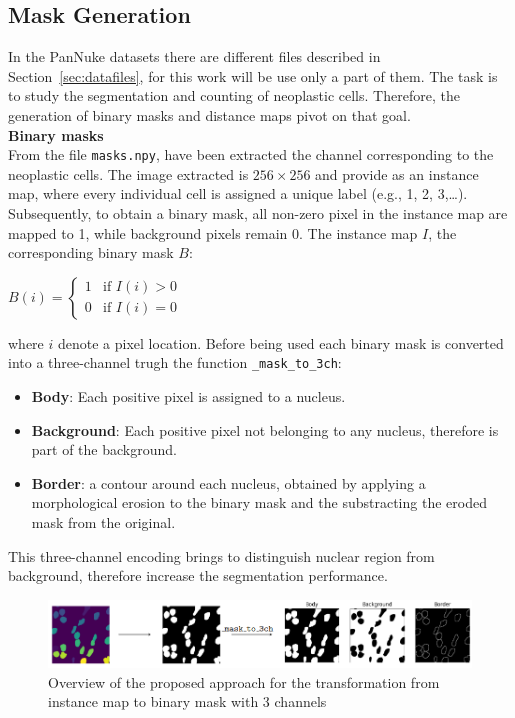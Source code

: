 \documentclass[target=bach,aauheader=,style=]{thud}
\begin{document}
\subsection{Mask Generation}
In the PanNuke datasets there are different files described in Section~\ref{sec:datafiles}, for this work will be use only a part of them. The task is to study the segmentation and counting of neoplastic cells. Therefore, the generation of binary masks and distance maps pivot on that goal.\\

\noindent\textbf{Binary masks}\\
\label{sec:maskgeneration}
From the file \texttt{masks.npy}, have been extracted the channel corresponding to the neoplastic cells. The image extracted is $256 \times 256$ and provide as an instance map, where every individual cell is assigned a unique label (e.g., 1, 2, 3,\dots). Subsequently, to obtain a binary mask, all non-zero pixel in the instance map are mapped to 1, while background pixels remain 0. The instance map $I$, the corresponding binary mask $B$:
\begin{center}
$
B(i) = 
\begin{cases}
1 & \text{if } I(i) > 0 \\
0 & \text{if } I(i) = 0
\end{cases}
$
\end{center}
where $i$ denote a pixel location. Before being used each binary mask is converted into a three-channel trugh the function \texttt{\_mask\_to\_3ch}:
\begin{itemize}
    \item \textbf{Body}: Each positive pixel is assigned to a nucleus.
    \item \textbf{Background}: Each positive pixel not belonging to any nucleus, therefore is part of the background.
    \item \textbf{Border}: a contour around each nucleus, obtained by applying a morphological erosion to the binary mask and the substracting the eroded mask from the original.
\end{itemize}
This three-channel encoding brings to distinguish nuclear region from background, therefore increase the segmentation performance.\\
\begin{figure}[H] %
    \centering
    \includegraphics[width=1\textwidth]{imgs/binarymask_transform.png}
    \caption{Overview of the proposed approach for the transformation from instance map to binary mask with 3 channels}
    \label{fig:esempio}
\end{figure}
\end{document}
